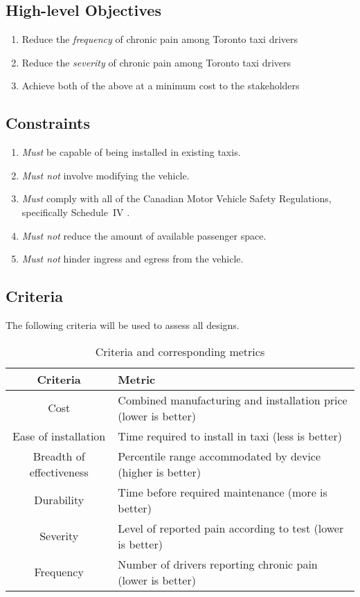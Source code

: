 \documentclass[11pt]{article}
\begin{document}
\subsection{High-level Objectives}
\label{sec:high-level-objectives}

\begin{enumerate}
\item Reduce the \emph{frequency} of chronic pain among Toronto taxi drivers
\item Reduce the \emph{severity} of chronic pain among Toronto taxi drivers
\item Achieve both of the above at a minimum cost to the stakeholders
\end{enumerate}

\subsection{Constraints}
\begin{enumerate}
\item \emph{Must} be capable of being installed in existing taxis.
\item \emph{Must not} involve modifying the vehicle.
\item \emph{Must} comply with all of the Canadian Motor Vehicle Safety Regulations,
specifically Schedule~IV \cite{motorregs}.
\item \emph{Must not} reduce the amount of available passenger space.
\item \emph{Must not} hinder ingress and egress from the vehicle.
\end{enumerate}
\subsection{Criteria}
The following criteria will be used to assess all designs.
\begin{table}[h]
\centering
\caption{Criteria and corresponding metrics}
\begin{tabular}{c p{10cm} }
  Criteria & Metric \\ \hline
  Cost & Combined manufacturing and installation price (lower is better) \\
  Ease of installation & Time required to install in taxi (less is better) \\
  Breadth of effectiveness & Percentile range accommodated by device (higher is better) \\
  Durability & Time before required maintenance (more is better) \\
  Severity & Level of reported pain according to test (lower is better) \\
  Frequency & Number of drivers reporting chronic pain (lower is better)
\end{tabular}
\end{table}
\end{document}
